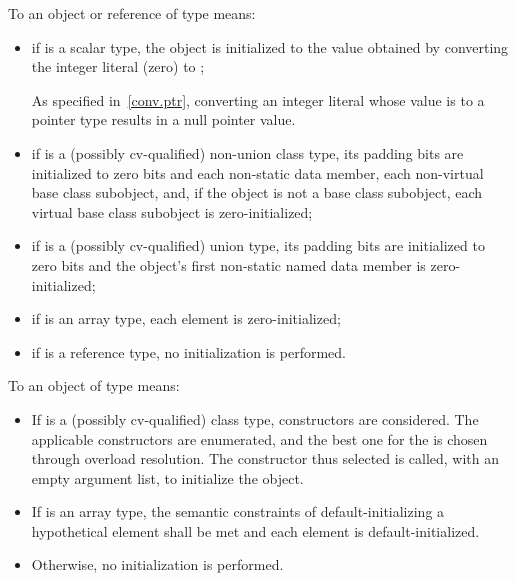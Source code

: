 \pnum
{}%
%
%
To
an object or reference of type
means:
\begin{itemize}
\item
if
is a scalar type, the
object
is initialized to the value obtained by converting the integer literal 
(zero) to
;
\begin{footnote}
As specified in~\ref{conv.ptr}, converting an integer
literal whose value is
to a pointer type results in a null pointer value.
\end{footnote}

\item
if
is a (possibly cv-qualified) non-union class type,
its padding bits are initialized to zero bits and
each non-static data member,
each non-virtual base class subobject, and,
if the object is not a base class subobject,
each virtual base class subobject
is zero-initialized;

\item
if
is a (possibly cv-qualified) union type,
its padding bits are initialized to zero bits and
the
object's first non-static named
data member
is zero-initialized;

\item
if
is an array type,
each element is zero-initialized;
\item
if
is a reference type, no initialization is performed.
\end{itemize}

\pnum
To
an object of type
means:

\begin{itemize}
\item
If
is a (possibly cv-qualified) class type,
constructors are considered. The applicable constructors are
enumerated, and the best one for the
 \tcode{()} is chosen through
overload resolution. The constructor thus selected
is called, with an empty argument list, to initialize the object.

\item
If
is an array type,
the semantic constraints of default-initializing a hypothetical element
shall be met and
each element is default-initialized.

\item
Otherwise,
no initialization is performed.
\end{itemize}

